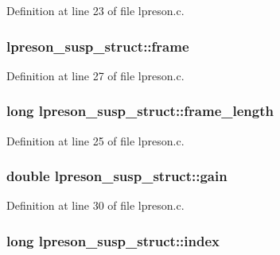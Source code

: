 Definition at line 23 of file lpreson.\+c.

\subsubsection[{\texorpdfstring{frame}{frame}}]{ lpreson\+\_\+susp\+\_\+struct\+::frame}\hypertarget{structlpreson__susp__struct_a3c376550ede2c830247345c6156a8cf4}{}\label{structlpreson__susp__struct_a3c376550ede2c830247345c6156a8cf4}


Definition at line 27 of file lpreson.\+c.

\subsubsection[{\texorpdfstring{frame\+\_\+length}{frame_length}}]{\setlength{\rightskip}{0pt plus 5cm}long lpreson\+\_\+susp\+\_\+struct\+::frame\+\_\+length}\hypertarget{structlpreson__susp__struct_a5a810e2c2d60c71357a726f0137e2b9c}{}\label{structlpreson__susp__struct_a5a810e2c2d60c71357a726f0137e2b9c}


Definition at line 25 of file lpreson.\+c.

\subsubsection[{\texorpdfstring{gain}{gain}}]{\setlength{\rightskip}{0pt plus 5cm}double lpreson\+\_\+susp\+\_\+struct\+::gain}\hypertarget{structlpreson__susp__struct_aa469be8e66d11f7e56be9514caa10946}{}\label{structlpreson__susp__struct_aa469be8e66d11f7e56be9514caa10946}


Definition at line 30 of file lpreson.\+c.

\subsubsection[{\texorpdfstring{index}{index}}]{\setlength{\rightskip}{0pt plus 5cm}long lpreson\+\_\+susp\+\_\+struct\+::index}\hypertarget{structlpreson__susp__struct_a53a1ff0fec497ebbccde0f19f222078f}{}\label{structlpreson__susp__struct_a53a1ff0fec497ebbccde0f19f222078f}


